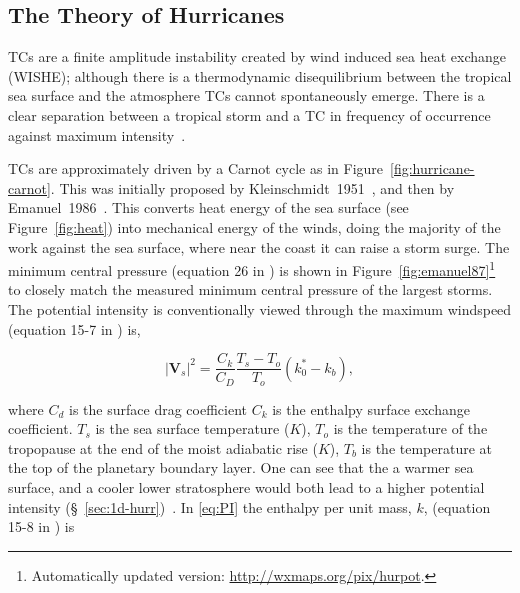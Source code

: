
\subsection{The Theory of Hurricanes}
\label{sec:hurr-theory}

\label{sec:cyclogenesis}
TCs are a finite amplitude instability created by
wind induced sea heat exchange (WISHE);
although there is a thermodynamic disequilibrium between the tropical sea
surface and the atmosphere TCs cannot spontaneously emerge. There is
a clear separation between a tropical storm and a TC
in frequency of occurrence against maximum intensity~\cite{emanuel2005divine}.


\label{sec:carnot}





TCs are approximately driven by a Carnot cycle as in Figure~\ref{fig:hurricane-carnot}.
This was initially proposed by Kleinschmidt~1951~\cite{kleinschmidt1951grundlagen},
and then by Emanuel~1986~\cite{emanuel1986air, emanuel1987dependence, lilly1985steady,}.
This converts heat energy of the sea surface
(see Figure~\ref{fig:heat}) into
mechanical energy of the winds, doing the majority of the work against the sea surface,
 where near the coast it can raise a storm surge.
 The minimum central pressure (equation 26 in \cite{emanuel1986air}) is
 shown in Figure~\ref{fig:emanuel87}\footnote{Automatically updated version: \url{http://wxmaps.org/pix/hurpot}.}
 to closely match the measured
minimum central pressure of the largest storms.
The potential intensity is conventionally viewed through the
maximum windspeed (equation 15-7 in \cite{emanuel2018progress}) is,

\begin{equation}
\left|\mathbf{V}_{s}\right|^{2}=\frac{C_{k}}{C_{D}}
\frac{T_{s}-T_{o}}{T_{o}}\left(k_{0}^{*}-k_b\right),
\tag{PI}
\label{eq:PI}
\end{equation}

where $C_d$ is the surface drag coefficient $C_k$ is the
 enthalpy surface exchange coefficient.
$T_s$ is the sea surface temperature ($K$), $T_o$ is the temperature of the
tropopause at the end of the moist adiabatic rise ($K$), $T_b$ is
the temperature at the top of the planetary boundary layer.
One can see that the a warmer sea surface, and a cooler lower stratosphere
would both lead to a higher potential intensity
(§~\ref{sec:1d-hurr})~\cite{emanuel1991theory, emanuel2018progress}.
In \ref{eq:PI} the enthalpy per unit mass, $k$,
(equation 15-8 in \cite{emanuel2018progress}) is

